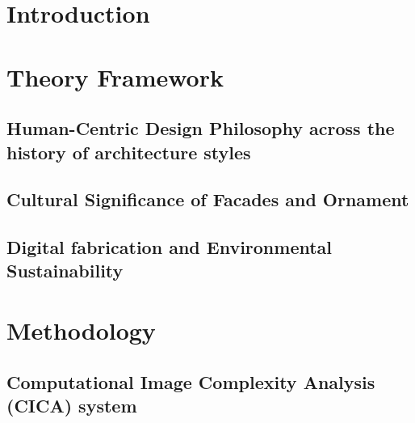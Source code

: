 \documentclass[final,5p,times]{elsarticle}
\begin{document}
\begin{linenumbers}


\section{Introduction}
\label{sec:1Introduction}


\section{Theory Framework}
\label{sec:Theory Framework}

    \subsection{Human-Centric Design Philosophy across the history of architecture styles}
    \label{subsec:TimelineArchitectureStyles}
    

    \subsection{Cultural Significance of Facades and Ornament}
    \label{subsec:FacadeandOrnament}
    

    \subsection{Digital fabrication and Environmental Sustainability}
    \label{subsec:DigitalFabricationAndEnvSustainability}
    



\section{Methodology}
\label{sec:Methodology}


    \subsection{Computational Image Complexity Analysis (CICA) system}
    \label{subsec:Image Complexity analysis}
    


\end{linenumbers}
\end{document}

